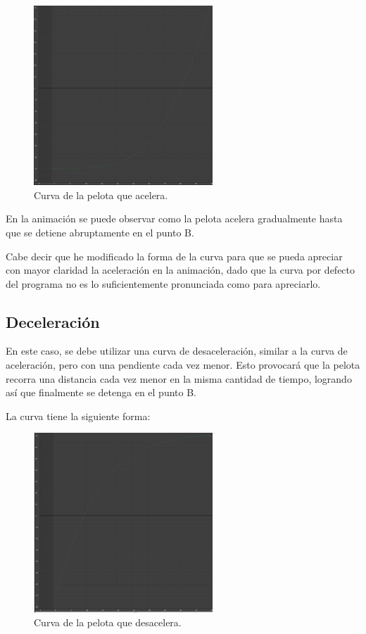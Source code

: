 \documentclass{article}
\begin{document}
\begin{figure}[H]
    \centering
    \includegraphics[width=0.6\textwidth]{imagenes/Ejercicio 1/curvas/aceleracion.png}
    \caption{Curva de la pelota que acelera.}
\end{figure}

En la animación se puede observar como la pelota acelera gradualmente hasta que se detiene abruptamente en el punto B.

\bigskip

Cabe decir que he modificado la forma de la curva para que se pueda apreciar con mayor claridad la aceleración en la animación, dado que la curva por defecto del programa no es lo suficientemente pronunciada como para apreciarlo.

\newpage

\subsection{Deceleración}

En este caso, se debe utilizar una curva de desaceleración, similar a la curva de aceleración, pero con una pendiente cada vez menor. Esto provocará que la pelota recorra una distancia cada vez menor en la misma cantidad de tiempo, logrando así que finalmente se detenga en el punto B.

\bigskip

La curva tiene la siguiente forma:

\begin{figure}[H]
    \centering
    \includegraphics[width=0.6\textwidth]{imagenes/Ejercicio 1/curvas/deceleracion.png}
    \caption{Curva de la pelota que desacelera.}
\end{figure}
\end{document}
